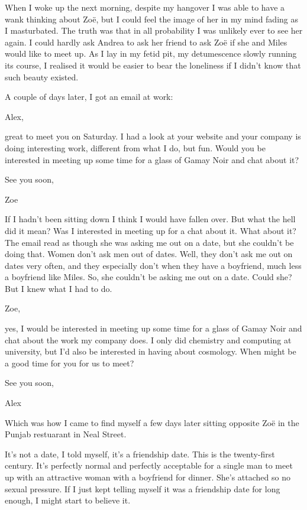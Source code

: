 When I woke up the next morning, despite my hangover I was able to
have a wank thinking about Zo{\"e}, but I could feel the image of
her in my mind fading as I masturbated. The truth was that in all probability I was
unlikely ever to see her again. I could hardly ask Andrea to ask her
friend to ask Zo{\"e} if she and Miles would like to meet up. As I lay in my fetid pit, my detumescence
slowly running its course, I realised it
would be easier to bear the loneliness if I didn't know that such
beauty existed.

A couple of days later, I got an email at work:

{\twelvett Alex,

great to meet you on Saturday. I had a look at your website and your
company is doing interesting work, different from what I do, but
fun. Would you be interested in meeting up some time for a glass of
Gamay Noir and chat about it?

See you soon,

Zoe}

If I hadn't been sitting down I think I would have fallen over. But
what the hell did it mean? Was I interested in meeting up for a chat
about it. What about it? The email read as though she was asking me
out on a date, but she couldn't be doing that. Women don't ask men
out of dates. Well, they don't ask me out on dates very often, and
they especially don't when they have a boyfriend, much less a
boyfriend like Miles. So, she couldn't be asking me out on a date.
Could she? But I knew what I had to do.

{\twelvett Zoe,

yes, I would be interested in meeting up some time for a glass of
Gamay Noir and chat about the work my company does. I only did
chemistry and computing at university, but I'd also be interested in
having about cosmology. When might be a good time for you for us to
meet?

See you soon,

Alex}

Which was how I came to find myself a few days later sitting
opposite Zo{\"e} in the Punjab restuarant in Neal Street.

It's not a {\twelveit date\/}, I told myself, it's a {\twelveit
friendship\/} date. This is the twenty-first century. It's perfectly
normal and perfectly acceptable for a single man to meet up with an
attractive woman with a boyfriend for dinner. She's attached so no
sexual pressure. If I just kept telling myself it was a friendship
date for long enough, I might start to believe it.

